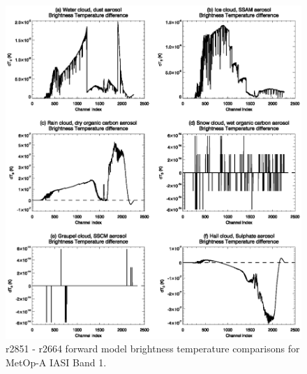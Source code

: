 \begin{figure}[htb]
  \centering
  \includegraphics[scale=1.0]{graphics/iasiB1_metop-a.eps}
  \caption{r2851 - r2664 forward model brightness temperature comparisons for MetOp-A IASI Band 1.}
  \label{fig:iasiB1_metop-a}
\end{figure}

